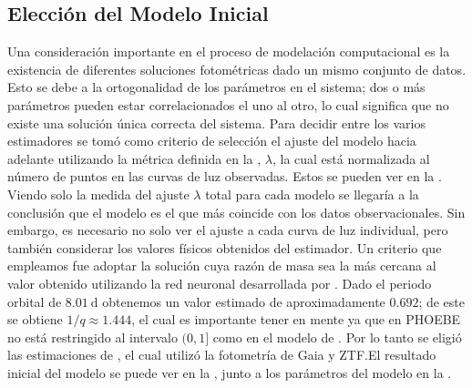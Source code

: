 \subsection{Elección del Modelo Inicial}

Una consideración importante en el proceso de modelación computacional es la
existencia de diferentes soluciones fotométricas dado un mismo conjunto de
datos. Esto se debe a la ortogonalidad de los parámetros en el sistema; dos o
más parámetros pueden estar correlacionados el uno al otro, lo cual significa
que no existe una solución única correcta del sistema. Para decidir entre los
varios estimadores se tomó como criterio de selección el ajuste del modelo hacia
adelante utilizando la métrica definida en la
, $\lambda$, la cual está normalizada al
número de puntos en las curvas de luz observadas. Estos se pueden ver en la
. Viendo solo la medida del ajuste $\lambda$
total para cada modelo se llegaría a la conclusión que el modelo
 es el que más coincide con los datos
observacionales. Sin embargo, es necesario no solo ver el ajuste a cada curva de
luz individual, pero también considerar los valores físicos obtenidos del
estimador. Un criterio que empleamos fue adoptar la solución cuya razón de masa
 sea la más cercana al valor obtenido utilizando la red neuronal
desarrollada por
. Dado
el periodo orbital de $8.01 \ \mathrm{d}$ obtenemos un valor estimado de
aproximadamente $0.692$; de este se obtiene $1/q \approx 1.444$, el cual es
importante tener en mente ya que  en PHOEBE no está restringido al
intervalo $(0, 1]$ como en el modelo de
. Por lo
tanto se eligió las estimaciones de , el
cual utilizó la fotometría de Gaia y ZTF.El resultado inicial del modelo se
puede ver en la , junto a los
parámetros del modelo en la .

